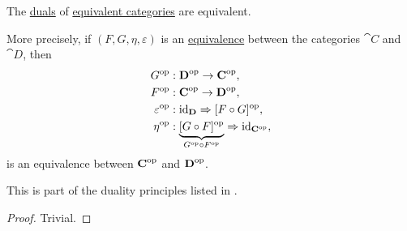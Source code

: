 \begin{proposition}\label{thm:opposite_of_category_equivalence}
  The \hyperref[def:dual_category]{duals} of \hyperref[def:category_equivalence]{equivalent categories} are equivalent.

  More precisely, if \( (F, G, \eta, \varepsilon) \) is an \hyperref[def:category_equivalence]{equivalence} between the categories \( \cat{C} \) and \( \cat{D} \), then
  \begin{equation*}
    \begin{aligned}
                G^{\opcat} &: \cat{D}^{\opcat} \to \cat{C}^{\opcat}, \\
                F^{\opcat} &: \cat{C}^{\opcat} \to \cat{D}^{\opcat}, \\
      \varepsilon^{\opcat} &: \id_{\cat{D}} \Rightarrow [F \bincirc G]^{\opcat}, \\
             \eta^{\opcat} &: \underbrace{[G \bincirc F]^{\opcat}}_{G^{\opcat} \bincirc F^{\opcat}} \Rightarrow \id_{\cat{C}^{\opcat}},
    \end{aligned}
  \end{equation*}
  is an equivalence between \( \operatorname{\mathbf{C}}^{\operatorname{op}} \) and \( \operatorname{\mathbf{D}}^{\operatorname{op}} \).

  This is part of the duality principles listed in .
\end{proposition}
\begin{proof}
  Trivial.
\end{proof}

